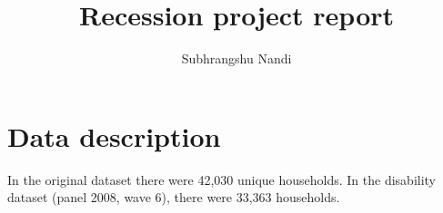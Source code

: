 \documentclass[11pt]{extarticle} %
\begin{document}

\title{Recession project report}
\author{Subhrangshu Nandi \\
\date{}
}

\maketitle

\section{Data description}
In the original dataset there were 42,030 unique households. In the disability dataset (panel 2008, wave 6), there were 33,363 households. 
\end{document}
